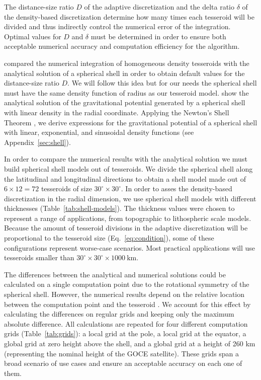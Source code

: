 \documentclass[extra, referee]{gji}
\begin{document}
The distance-size ratio $D$ of the adaptive discretization and the delta ratio $\delta$
of the density-based discretization determine how many times each tesseroid will be
divided and thus indirectly control the numerical error of the integration.
Optimal values for $D$ and $\delta$ must be determined in order to ensure both
acceptable numerical accuracy and computation efficiency for the algorithm.

\citet{Uieda2016} compared the numerical integration of homogeneous density tesseroids
with the analytical solution of a spherical shell \citep{Mikuska2006, Grombein2013} in
order to obtain default values for the distance-size ratio $D$.
We will follow this idea but for our needs the spherical shell must
have the same density function of radius as our tesseroid model.
\citet{Lin2018} show the analytical solution of the gravitational potential generated by
a spherical shell with linear density in the radial coordinate.
Applying the Newton's Shell Theorem \citep{Chandrasekhar1995, Binney2008},
we derive expressions for the gravitational potential of a spherical shell with
linear, exponential, and sinusoidal density functions
(see Appendix~\ref{sec:shell}).

In order to compare the numerical results with the analytical solution we must build
spherical shell models out of tesseroids.
We divide the spherical shell along the latitudinal and longitudinal directions to
obtain a shell model made out of $6 \times 12 = 72$ tesseroids of size
$30^\circ \times 30^\circ$.
In order to asses the density-based discretization in the radial dimension,
we use spherical shell models with different thicknesses (Table~\ref{tab:shell-models}).
The thickness values were chosen to represent a range of applications, from topographic
to lithospheric scale models.
Because the amount of tesseroid divisions in the adaptive discretization will be
proportional to the tesseroid size (Eq.~\ref{eq:condition}),
some of these configurations represent worse-case scenarios.
Most practical applications will use tesseroids smaller than
$30^\circ \times 30^\circ \times 1000\ \text{km}$.

The differences between the analytical and numerical solutions could be calculated on a
single computation point due to the rotational symmetry of the spherical shell.
However, the numerical results depend on the relative location between the computation
point and the tesseroid \citep{Ku1977, Asgharzadeh2007, Uieda2016}.
We account for this effect by calculating the differences on regular grids and keeping
only the maximum absolute difference.
All calculations are repeated for four different computation grids
(Table~\ref{tab:grids}):
a local grid at the pole, a local grid at the equator, a global grid at zero height
above the shell, and a global grid at a height of 260 km (representing the nominal
height of the GOCE satellite).
These grids span a broad scenario of use cases and ensure an acceptable accuracy on each
one of them.
\end{document}
